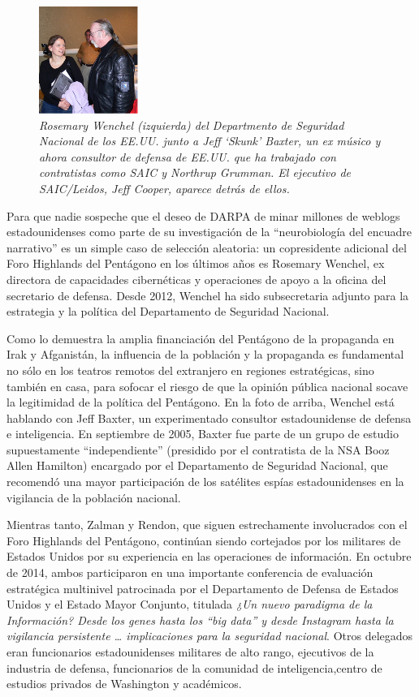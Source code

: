 \documentclass[10pt,a5paper,twoside,spanish,]{book}
\begin{document}
\begin{figure}[htbp]
\centering
\includegraphics{2.7.png}
\caption{\emph{Rosemary Wenchel (izquierda) del Departmento de Seguridad
Nacional de los EE.UU. junto a Jeff `Skunk' Baxter, un ex músico y ahora
consultor de defensa de EE.UU. que ha trabajado con contratistas como
SAIC y Northrup Grumman. El ejecutivo de SAIC/Leidos, Jeff Cooper,
aparece detrás de ellos.}}
\end{figure}

Para que nadie sospeche que el deseo de DARPA de minar millones de
weblogs estadounidenses como parte de su investigación de la
``neurobiología del encuadre narrativo'' es un simple caso de selección
aleatoria: un copresidente adicional del Foro Highlands del Pentágono en
los últimos años es Rosemary Wenchel, ex directora de capacidades
cibernéticas y operaciones de apoyo a la oficina del secretario de
defensa. Desde 2012, Wenchel ha sido subsecretaria adjunto para la
estrategia y la política del Departamento de Seguridad Nacional.

Como lo demuestra la amplia financiación del Pentágono de la propaganda
en Irak y Afganistán, la influencia de la población y la propaganda es
fundamental no sólo en los teatros remotos del extranjero en regiones
estratégicas, sino también en casa, para sofocar el riesgo de que la
opinión pública nacional socave la legitimidad de la política del
Pentágono. En la foto de arriba, Wenchel está hablando con Jeff Baxter,
un experimentado consultor estadounidense de defensa e inteligencia. En
septiembre de 2005, Baxter fue parte de un grupo de estudio
supuestamente ``independiente'' (presidido por el contratista de la NSA
Booz Allen Hamilton) encargado por el Departamento de Seguridad
Nacional, que recomendó una mayor participación de los satélites espías
estadounidenses en la vigilancia de la población nacional.

Mientras tanto, Zalman y Rendon, que siguen estrechamente involucrados
con el Foro Highlands del Pentágono, continúan siendo cortejados por los
militares de Estados Unidos por su experiencia en las operaciones de
información. En octubre de 2014, ambos participaron en una importante
conferencia de evaluación estratégica multinivel patrocinada por el
Departamento de Defensa de Estados Unidos y el Estado Mayor Conjunto,
titulada \emph{¿Un nuevo paradigma de la Información? Desde los genes
hasta los ``big data'' y desde Instagram hasta la vigilancia persistente
\ldots{} implicaciones para la seguridad nacional}. Otros delegados eran
funcionarios estadounidenses militares de alto rango, ejecutivos de la
industria de defensa, funcionarios de la comunidad de
inteligencia,centro de estudios privados de Washington y académicos.
\end{document}
